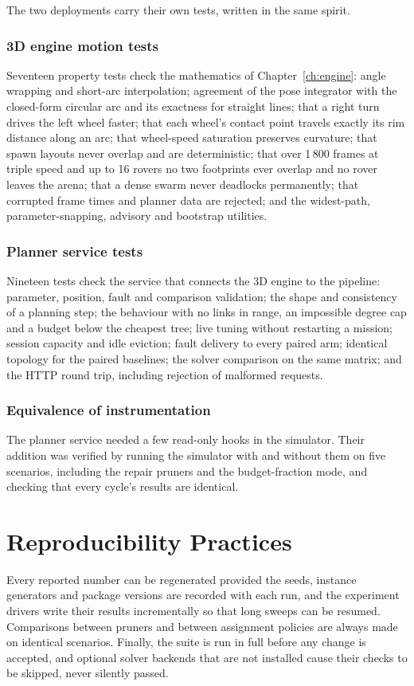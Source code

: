 The two deployments carry their own tests, written in the same spirit.

\subsubsection{3D engine motion tests} Seventeen property tests check the
mathematics of Chapter~\ref{ch:engine}: angle wrapping and short-arc
interpolation; agreement of the pose integrator with the closed-form circular
arc and its exactness for straight lines; that a right turn drives the left
wheel faster; that each wheel's contact point travels exactly its rim
distance along an arc; that wheel-speed saturation preserves curvature; that
spawn layouts never overlap and are deterministic; that over 1\,800 frames at
triple speed and up to 16 rovers no two footprints ever overlap and no rover
leaves the arena; that a dense swarm never deadlocks permanently; that
corrupted frame times and planner data are rejected; and the widest-path,
parameter-snapping, advisory and bootstrap utilities.

\subsubsection{Planner service tests} Nineteen tests check the service that
connects the 3D engine to the pipeline: parameter, position, fault and
comparison validation; the shape and consistency of a planning step; the
behaviour with no links in range, an impossible degree cap and a budget below
the cheapest tree; live tuning without restarting a mission; session
capacity and idle eviction; fault delivery to every paired arm; identical
topology for the paired baselines; the solver comparison on the same matrix;
and the HTTP round trip, including rejection of malformed requests.

\subsubsection{Equivalence of instrumentation} The planner service needed a
few read-only hooks in the simulator. Their addition was verified by running
the simulator with and without them on five scenarios, including the repair
pruners and the budget-fraction mode, and checking that every cycle's
results are identical.

\section{Reproducibility Practices}

Every reported number can be regenerated provided the seeds, instance
generators and package versions are recorded with each run, and the
experiment drivers write their results incrementally so that long sweeps can
be resumed. Comparisons between pruners and between assignment policies are
always made on identical scenarios. Finally, the suite is run in full before
any change is accepted, and optional solver backends that are not installed
cause their checks to be skipped, never silently passed.
